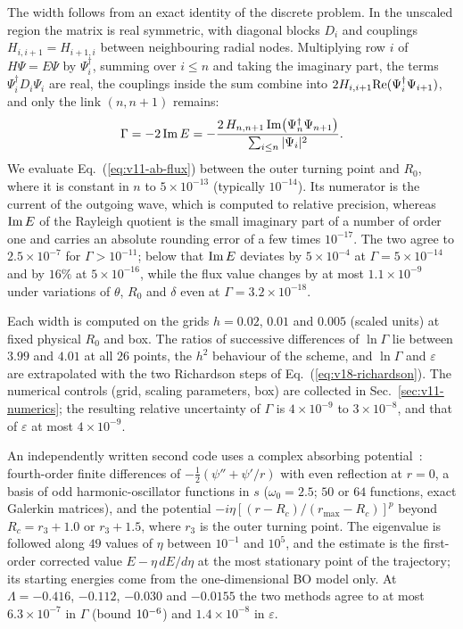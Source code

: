 The width follows from an exact identity of the discrete problem.
In the unscaled region the matrix is real symmetric, with diagonal blocks $D_i$ and couplings $H_{i,i+1}=H_{i+1,i}$ between neighbouring radial nodes.
Multiplying row $i$ of $H\Psi=E\Psi$ by $\Psi_i^\dagger$, summing over $i\le n$ and taking the imaginary part, the terms $\Psi_i^\dagger D_i\Psi_i$ are real, the couplings inside the sum combine into $2H_{i,i+1}{\rm Re}(\Psi_i^\dagger\Psi_{i+1})$, and only the link $(n,n+1)$ remains:
\begin{equation}
\Gamma=-2\,{\rm Im}\,E=-\frac{2\,H_{n,n+1}\,{\rm Im}\bigl(\Psi_n^\dagger\Psi_{n+1}\bigr)}{\sum_{i\le n}|\Psi_i|^2} .
\label{eq:v11-ab-flux}
\end{equation}
We evaluate Eq.~(\ref{eq:v11-ab-flux}) between the outer turning point and $R_0$, where it is constant in $n$ to $5\times10^{-13}$ (typically $10^{-14}$). %
Its numerator is the current of the outgoing wave, which is computed to relative precision, whereas ${\rm Im}\,E$ of the Rayleigh quotient is the small imaginary part of a number of order one and carries an absolute rounding error of a few times $10^{-17}$.
The two agree to $2.5\times10^{-7}$ for $\Gamma>10^{-11}$; below that ${\rm Im}\,E$ deviates by $5\times10^{-4}$ at $\Gamma=5\times10^{-14}$ and by $16\%$ at $5\times10^{-16}$, while the flux value changes by at most $1.1\times10^{-9}$ under variations of $\theta$, $R_0$ and $\delta$ even at $\Gamma=3.2\times10^{-18}$. %

Each width is computed on the grids $h=0.02$, $0.01$ and $0.005$ (scaled units) at fixed physical $R_0$ and box. %
The ratios of successive differences of $\ln\Gamma$ lie between $3.99$ and $4.01$ at all $26$ points, the $h^2$ behaviour of the scheme, and $\ln\Gamma$ and $\varepsilon$ are extrapolated with the two Richardson steps of Eq.~(\ref{eq:v18-richardson}). %
The numerical controls (grid, scaling parameters, box) are collected in Sec.~\ref{sec:v11-numerics}; the resulting relative uncertainty of $\Gamma$ is $4\times10^{-9}$ to $3\times10^{-8}$, and that of $\varepsilon$ at most $4\times10^{-9}$. %

An independently written second code uses a complex absorbing potential~\cite{Riss:1993cap}: fourth-order finite differences of $-\frac12(\psi''+\psi'/r)$ with even reflection at $r=0$, a basis of odd harmonic-oscillator functions in $s$ ($\omega_0=2.5$; $50$ or $64$ functions, exact Galerkin matrices), and the potential $-i\eta[(r-R_c)/(r_{\max}-R_c)]^p$ beyond $R_c=r_3+1.0$ or $r_3+1.5$, where $r_3$ is the outer turning point. %
The eigenvalue is followed along $49$ values of $\eta$ between $10^{-1}$ and $10^5$, and the estimate is the first-order corrected value $E-\eta\,dE/d\eta$ at the most stationary point of the trajectory; its starting energies come from the one-dimensional BO model only. %
At $\Lambda=-0.416$, $-0.112$, $-0.030$ and $-0.0155$ the two methods agree to at most $6.3\times10^{-7}$ in $\Gamma$ (bound $10^{-6}$) and $1.4\times10^{-8}$ in $\varepsilon$. %


